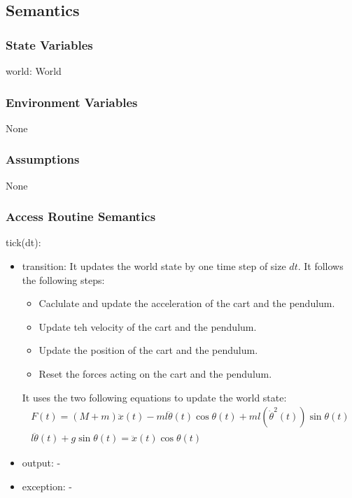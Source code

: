 \documentclass[12pt, titlepage]{article}
\begin{document}
\subsection{Semantics}

\subsubsection{State Variables}

world: World


\subsubsection{Environment Variables}

None

\subsubsection{Assumptions}

None

\subsubsection{Access Routine Semantics}

\noindent tick(dt):
\begin{itemize}
\item transition:
      It updates the world state by one time step of size $dt$.
      It follows the following steps:
      \begin{itemize}
        \item Caclulate and update the acceleration of the cart and the pendulum.
        \item Update teh velocity of the cart and the pendulum.
        \item Update the position of the cart and the pendulum.
        \item Reset the forces acting on the cart and the pendulum.
      \end{itemize}
      It uses the two following equations to update the world state:
      \begin{gather*}
        F(t) = (M+m)\ddot{x}(t) - ml\ddot{\theta}(t)\cos{\theta(t)} 
        + ml (\dot{\theta}^2(t)) \sin{\theta(t)} \\
        l \ddot{\theta}(t) + g \sin{\theta(t)} = \ddot{x}(t) \cos{\theta(t)}
      \end{gather*}
\item output: -
\item exception: -
\end{itemize}
\end{document}
